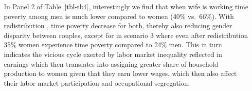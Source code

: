 \documentclass[
  11pt,
]{article}
\begin{document}
In Panel 2 of Table~\ref{tbl-tb4}, interestingly we find that when wife
is working time poverty among men is much lower compared to women (40\%
vs.~66\%). With redistribution , time poverty decrease for both, thereby
also reducing gender disparity between couples, except for in scenario 3
where even after redistribution 35\% women experience time poverty
compared to 24\% men. This in turn indicates the vicious cycle exerted
by labor market inequality reflected in earnings which then translates
into assigning greater share of household production to women given that
they earn lower wages, which then also affect their labor market
participation and occupational segregation.

\begin{table}

\caption{\label{tbl-tb4}Time Poverty by Income}


\end{table}%
\end{document}
